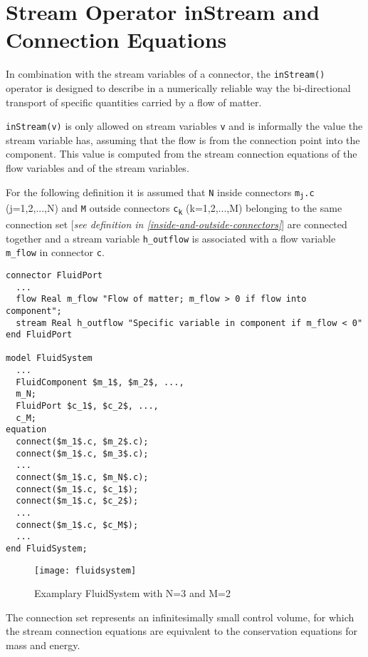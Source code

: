\section{Stream Operator inStream and Connection Equations}

In combination with the stream variables of a connector, the
\lstinline!inStream()! operator is designed to describe in a numerically
reliable way the bi-directional transport of specific quantities carried
by a flow of matter.

\lstinline!inStream(v)! is only allowed on stream variables \lstinline!v! and is
informally the value the stream variable has, assuming that the flow is
from the connection point into the component. This value is computed
from the stream connection equations of the flow variables and of the
stream variables.

For the following definition it is assumed that \lstinline!N! inside connectors
\texttt{m\textsubscript{j}.c} (j=1,2,...,N) and \lstinline!M! outside connectors
\texttt{c\textsubscript{k}} (k=1,2,...,M) belonging to the same connection set
{[}\emph{see definition in \autoref{inside-and-outside-connectors}}{]} are connected
together and a stream variable \lstinline!h_outflow! is associated with a flow
variable \lstinline!m_flow! in connector \lstinline!c!.

\begin{lstlisting}[language=modelica,mathescape=true]
connector FluidPort
  ...
  flow Real m_flow "Flow of matter; m_flow > 0 if flow into component";
  stream Real h_outflow "Specific variable in component if m_flow < 0"
end FluidPort

model FluidSystem
  ...
  FluidComponent $m_1$, $m_2$, ...,
  m_N;
  FluidPort $c_1$, $c_2$, ...,
  c_M;
equation
  connect($m_1$.c, $m_2$.c);
  connect($m_1$.c, $m_3$.c);
  ...
  connect($m_1$.c, $m_N$.c);
  connect($m_1$.c, $c_1$);
  connect($m_1$.c, $c_2$);
  ...
  connect($m_1$.c, $c_M$);
  ...
end FluidSystem;
\end{lstlisting}
\begin{figure}[H]
\caption{Examplary FluidSystem with N=3 and M=2}
\begin{center}
\texttt{[image: fluidsystem]}
\end{center}
\end{figure}

\begin{nonnormative}
The connection set represents an infinitesimally small control
volume, for which the stream connection equations are equivalent to the
conservation equations for mass and energy.
\end{nonnormative}

